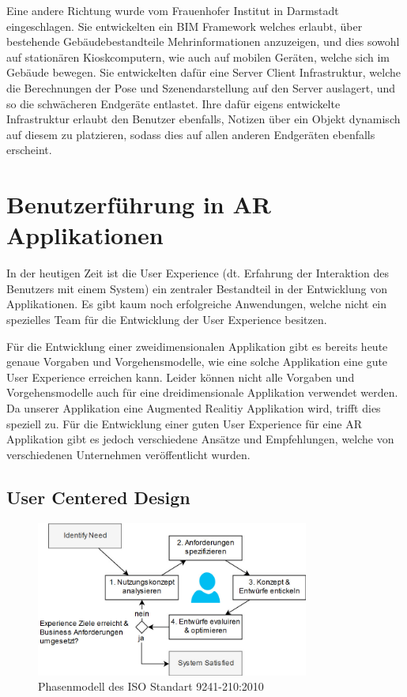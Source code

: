 \documentclass[a4paper]{scrreprt}
\begin{document}
Eine andere Richtung wurde vom Frauenhofer Institut in Darmstadt \parencite{Olbrich2013} eingeschlagen. Sie entwickelten ein BIM Framework welches erlaubt, über bestehende Gebäudebestandteile Mehrinformationen anzuzeigen, und dies sowohl auf stationären Kioskcomputern, wie auch auf mobilen Geräten, welche sich im Gebäude bewegen. Sie entwickelten dafür eine Server Client Infrastruktur, welche die Berechnungen der Pose und Szenendarstellung auf den Server auslagert, und so die schwächeren Endgeräte entlastet. Ihre dafür eigens entwickelte Infrastruktur erlaubt den Benutzer ebenfalls, Notizen über ein Objekt dynamisch auf diesem zu platzieren, sodass dies auf allen anderen Endgeräten ebenfalls erscheint.

\section{Benutzerführung in AR Applikationen}
In der heutigen Zeit ist die User Experience (dt. Erfahrung der Interaktion des Benutzers mit einem System) ein zentraler Bestandteil in der Entwicklung von Applikationen. Es gibt kaum noch erfolgreiche Anwendungen, welche nicht ein spezielles Team für die Entwicklung der User Experience besitzen.

Für die Entwicklung einer zweidimensionalen Applikation gibt es bereits heute genaue Vorgaben und Vorgehensmodelle, wie eine solche Applikation eine gute User Experience erreichen kann. Leider können nicht alle Vorgaben und Vorgehensmodelle auch für eine dreidimensionale Applikation verwendet werden. Da unserer Applikation eine Augmented Realitiy Applikation wird, trifft dies speziell zu.
Für die Entwicklung einer guten User Experience für eine AR Applikation gibt es jedoch verschiedene Ansätze und Empfehlungen, welche von verschiedenen Unternehmen veröffentlicht wurden.

\subsection{User Centered Design}
\begin{figure}[h!]
	\centering
	\includegraphics[keepaspectratio,width=0.8\textwidth]{UserCenteredDesign}
	\caption{Phasenmodell des ISO Standart 9241-210:2010 \parencite{ISO9241}}
\end{figure}
\end{document}
